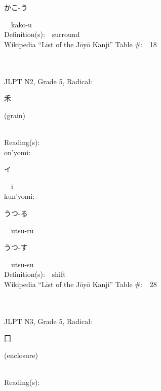 \begin{multicols}{2}
{\hspace*{2em}}{\begin{CJK}{UTF8}{min} かこ-う \end{CJK}}\ \ kako-u\ \ \\
Definition(s):\ \ surround \\
Wikipedia ``List of the J\=oy\=o Kanji'' Table \#:\ \ 18 \\
\ \ \\
{\fontsize{34pt}{40pt}  }\ \ \\  %
{JLPT N2, Grade 5, Radical:\ \ {\begin{CJK}{UTF8}{min} 禾 \end{CJK}} (grain) } \\
Reading(s):\ \ \\
{\hspace*{1em}}on'yomi:\ \ \\
{\hspace*{2em}}{\begin{CJK}{UTF8}{min} イ \end{CJK}}\ \ i\ \ \\
{\hspace*{1em}}kun'yomi:\ \ \\
{\hspace*{2em}}{\begin{CJK}{UTF8}{min} うつ-る \end{CJK}}\ \ utsu-ru\ \ \\
{\hspace*{2em}}{\begin{CJK}{UTF8}{min} うつ-す \end{CJK}}\ \ utsu-su\ \ \\
Definition(s):\ \ shift \\
Wikipedia ``List of the J\=oy\=o Kanji'' Table \#:\ \ 28 \\
\ \ \\
{\fontsize{34pt}{40pt}  }\ \ \\  %
{JLPT N3, Grade 5, Radical:\ \ {\begin{CJK}{UTF8}{min} 囗 \end{CJK}} (enclosure) } \\
Reading(s):\ \ \\

\end{multicols}
